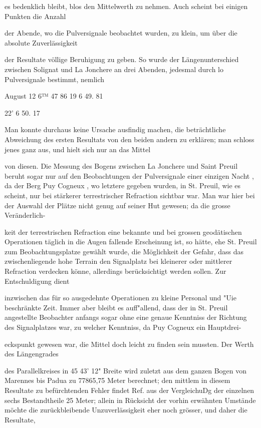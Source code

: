 \documentclass[10pt,a4paper]{article}
\begin{document}
es bedenklich bleibt, blos den Mittelwerth zu nehmen. Auch scheint bei einigen Punkten die Anzahl

der Abende, wo die Pulversignale beobachtet wurden, zu klein, um über die absolute Zuverlässigkeit

der Resultate völlige Beruhigung zu geben. So wurde der Längenunterschied zwischen Solignat und La Jonchere an drei Abenden, jedesmal durch lo Pulversignale bestimmt, nemlich

August 12 6™ 47 86 19 6 49. 81

22' 6 50. 17

Man konnte durchaus keine Ursache ausfindig machen, die beträchtliche Abweichung des ersten Resultats von den beiden andern zu erklären; man schloss jenes ganz aus, und hielt sich nur an das Mittel

von diesen. Die Messung des Bogens zwischen La Jonchere und Saint Preuil beruht sogar nur auf den Beobachtungen der Pulversignale einer einzigen Nacht , da der Berg Puy Cogneux , wo letztere gegeben wurden, in St. Preuil, wie es scheint, nur bei stärkerer terrestrischer Refraction sichtbar war. Man war hier bei der Auswahl der Plätze nicht genug auf seiner Hut gewesen; da die grosse Veränderlich-

keit der terrestrischen Refraction eine bekannte und bei grossen geodätischen Operationen täglich in die Augen fallende Erscheinung ist, so hätte, ehe St. Preuil zum Beobachtungsplatze gewählt wurde, die Möglichkeit der Gefahr, dass das zwischenliegende hohe Terrain den Signalplatz bei kleinerer oder mittlerer Refraction verdecken könne, allerdings berücksichtigt werden sollen. Zur Entschuldigung dient

inzwischen das für so ausgedehnte Operationen zu kleine Personal und "Uie beschränkte Zeit. Immer aber bleibt es auff"allend, dass der in St. Preuil angestellte Beobachter anfangs sogar ohne eine genaue Kenntniss der Richtung des Signalplatzes war, zu welcher Kenntniss, da Puy Cogneux ein Hauptdrei-

eckspunkt gewesen war, die Mittel doch leicht zu finden sein mussten. Der Werth des Längengrades

des Parallelkreises in 45\textdegree{} 43' 12" Breite wird zuletzt aus dem ganzen Bogen von Marennes bis Padua zu 77865,75 Meter berechnet; den mittlem in diesem Resultate zu befürchtenden Fehler findet Ref. aus der VergleichuDg der einzelnen sechs Bestandtheile 25 Meter; allein in Rücksicht der vorhin erwähnten Umstände möchte die zurückbleibende Unzuverlässigkeit eher noch grösser, und daher die Resultate,
\end{document}
